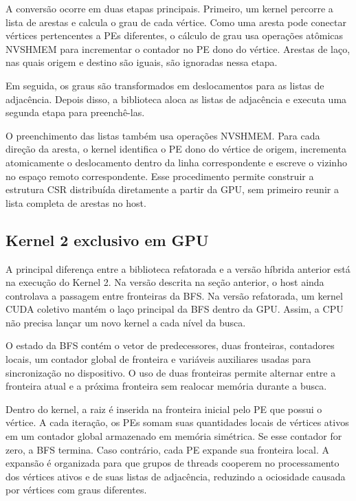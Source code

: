 A conversão ocorre em duas etapas principais. Primeiro, um kernel percorre a
lista de arestas e calcula o grau de cada vértice. Como uma aresta pode conectar
vértices pertencentes a PEs diferentes, o cálculo de grau usa operações atômicas
NVSHMEM para incrementar o contador no PE dono do vértice. Arestas de laço, nas
quais origem e destino são iguais, são ignoradas nessa etapa.

Em seguida, os graus são transformados em deslocamentos para as listas de
adjacência. Depois disso, a biblioteca aloca as listas de adjacência e
executa uma segunda etapa para preenchê-las.

O preenchimento das listas também usa operações NVSHMEM. Para cada direção da
aresta, o kernel identifica o PE dono do vértice de origem, incrementa
atomicamente o deslocamento dentro da linha correspondente e escreve o vizinho no
espaço remoto correspondente. Esse procedimento permite construir a estrutura CSR
distribuída diretamente a partir da GPU, sem primeiro reunir a lista completa de
arestas no host.

\subsection{Kernel 2 exclusivo em GPU}
\label{sec:bib-kernel2}

A principal diferença entre a biblioteca refatorada e a versão híbrida anterior
está na execução do Kernel 2. Na versão descrita na seção anterior, o host ainda
controlava a passagem entre fronteiras da BFS. Na versão refatorada, um kernel
CUDA coletivo mantém o laço principal da BFS dentro da GPU. Assim, a CPU não
precisa lançar um novo kernel a cada nível da busca.

O estado da BFS contém o vetor de predecessores, duas fronteiras, contadores
locais, um contador global de fronteira e variáveis auxiliares usadas para
sincronização no dispositivo. O uso de duas fronteiras permite alternar entre a
fronteira atual e a próxima fronteira sem realocar memória durante a busca.

Dentro do kernel, a raiz é inserida na fronteira inicial pelo PE que possui o
vértice. A cada iteração, os PEs somam suas quantidades locais de vértices ativos
em um contador global armazenado em memória simétrica. Se esse contador for zero,
a BFS termina. Caso contrário, cada PE expande sua fronteira local. A expansão é
organizada para que grupos de threads cooperem no processamento dos vértices
ativos e de suas listas de adjacência, reduzindo a ociosidade causada por
vértices com graus diferentes.


